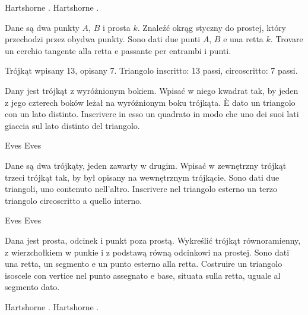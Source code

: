 Hartshorne \cite[s. 24]{hartshorne_2000}. %
Hartshorne \cite[p. 24]{hartshorne_2000}. %

\begin{problem}
    Dane są dwa punkty $A$, $B$ i prosta $k$. %
    Znaleźć okrąg styczny do prostej, który przechodzi przez obydwa punkty. %
    Sono dati due punti $A$, $B$ e una retta $k$. %
    Trovare un cerchio tangente alla retta e passante per entrambi i punti. %
\end{problem}

Trójkąt wpisany 13, opisany 7. %
Triangolo inscritto: 13 passi, circoscritto: 7 passi. %

\begin{problem}
    Dany jest trójkąt z wyróżnionym bokiem. %
    Wpisać w niego kwadrat tak, by jeden z jego czterech boków leżał na wyróżnionym boku trójkąta. %
    È dato un triangolo con un lato distinto. %
    Inscrivere in esso un quadrato in modo che uno dei suoi lati giaccia sul lato distinto del triangolo. %
\end{problem}

Eves \cite[s. 162]{eves1_1972} %
Eves \cite[p. 162]{eves1_1972} %

\begin{problem}
    Dane są dwa trójkąty, jeden zawarty w drugim. %
    Wpisać w zewnętrzny trójkąt trzeci trójkąt tak, by był opisany na wewnętrznym trójkącie. %
    Sono dati due triangoli, uno contenuto nell'altro. %
    Inscrivere nel triangolo esterno un terzo triangolo circoscritto a quello interno. %
\end{problem}

Eves \cite[s. 167]{eves1_1972} %
Eves \cite[p. 167]{eves1_1972} %

\begin{problem}
    Dana jest prosta, odcinek i punkt poza prostą. %
    Wykreślić trójkąt równoramienny, z wierzchołkiem w punkie i z podstawą równą odcinkowi na prostej. %
    Sono dati una retta, un segmento e un punto esterno alla retta. %
    Costruire un triangolo isoscele con vertice nel punto assegnato e base, situata sulla retta, uguale al segmento dato. %
\end{problem}

Hartshorne \cite[s. 25]{hartshorne_2000}. %
Hartshorne \cite[p. 25]{hartshorne_2000}. %

